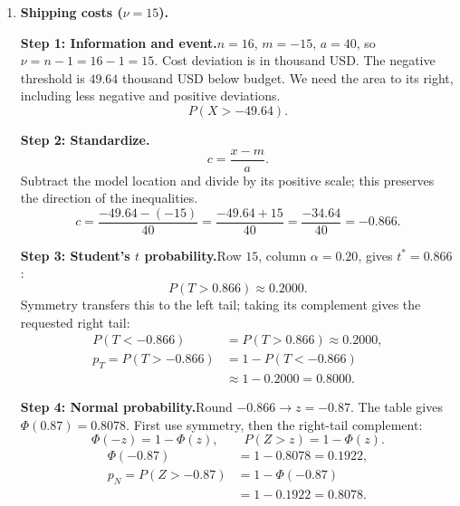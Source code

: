 \begin{enumerate}[leftmargin=*,label=\textbf{\arabic*.},itemsep=12pt,parsep=3pt,topsep=5pt]
\par\noindent\begin{minipage}{\linewidth}
\par\textbf{Step 6: Interpretation.}\nopagebreak\enspace The threshold means arriving more than $9.658$ minutes early (about $9.66$ minutes). The $t$ model assigns about $5.00\%$ to this event, and the normal model about $2.62\%$. The normal probability is lower by $0.0238$, or $2.38$ percentage points.
\end{minipage}\par
\item \begin{minipage}[t]{\linewidth}\textbf{Shipping costs ($\nu=15$).}\nopagebreak
\par\textbf{Step 1: Information and event.}\nopagebreak\enspace $n=16$, $m=-15$, $a=40$, so $\nu=n-1=16-1=15$. Cost deviation is in thousand USD. The negative threshold is $49.64$ thousand USD below budget. We need the area to its right, including less negative and positive deviations.\[
P(X>-49.64).
\]

\end{minipage}\par
\par\noindent\begin{minipage}{\linewidth}
\par\textbf{Step 2: Standardize.}\nopagebreak\enspace \[
c=\frac{x-m}{a}.
\]
Subtract the model location and divide by its positive scale; this preserves the direction of the inequalities.
\[
c=\frac{-49.64-(-15)}{40}=\frac{-49.64+15}{40}=\frac{-34.64}{40}=-0.866.
\]

\end{minipage}\par
\par\noindent\begin{minipage}{\linewidth}
\par\textbf{Step 3: Student's $t$ probability.}\nopagebreak\enspace Row $15$, column $\alpha=0.20$, gives $t^*=0.866$:
\[
P(T>0.866)\approx0.2000.
\]
Symmetry transfers this to the left tail; taking its complement gives the requested right tail:
\[
\begin{aligned}P(T<-0.866)&=P(T>0.866)\approx0.2000,\\p_T=P(T>-0.866)&=1-P(T<-0.866)\\&\approx1-0.2000=\boxed{0.8000}.\end{aligned}
\]

\end{minipage}\par
\par\textbf{Step 4: Normal probability.}\nopagebreak\enspace Round $-0.866\to z=-0.87$. The table gives $\Phi(0.87)=0.8078$. First use symmetry, then the right-tail complement:
\[
\Phi(-z)=1-\Phi(z),\qquad P(Z>z)=1-\Phi(z).
\]
\[
\begin{aligned}\Phi(-0.87)&=1-0.8078=0.1922,\\p_N=P(Z>-0.87)&=1-\Phi(-0.87)\\&=1-0.1922=\boxed{0.8078}.\end{aligned}
\]


\end{enumerate}
